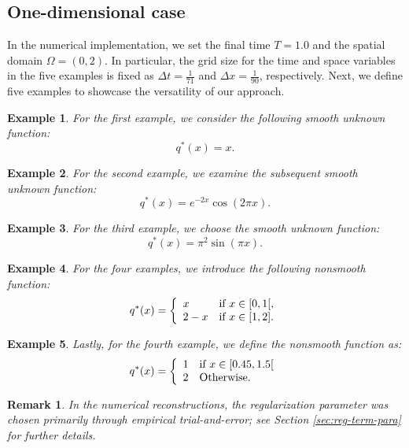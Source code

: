 \documentclass[a4paper,12pt,reqno,natbib]{amsart}
\newtheorem{exm}{Example}
\newtheorem{remark}[theorem]{Remark}
\begin{document}
{\subsection{One-dimensional case}

In the numerical implementation, we set the final time $T=1.0$ and the spatial domain $\Omega=(0,2)$. In particular, the grid size for the time and space variables in the five examples is fixed as $\Delta t=\displaystyle\frac{1}{71}$ and $\Delta x=\displaystyle\frac{1}{90}$, respectively. Next, we define five examples to showcase the versatility of our approach.

\begin{exm}\label{example0}
For the first example, we consider the following smooth unknown function:
\[ q^*(x)=x. \]
\end{exm}
\begin{exm}\label{example1}
For the second example, we examine the subsequent smooth unknown function:
\[ q^*(x)=e^{-2x}\cos(2\pi x). \]
\end{exm}

\begin{exm}\label{example2}
For the third example, we choose the smooth unknown function:
\[ q^*(x)=\pi^2\sin(\pi x). \]
\end{exm}

\begin{exm}\label{example3}
For the four examples, we introduce the following nonsmooth function:
\[ 
q^*(x)=\left\lbrace 
\begin{array}{ l l l l}
x & \text{if }  x\in [0,1[,\\
2-x & \text{if }  x\in [1,2] .
\end{array}
\right. 
\]
\end{exm}

\begin{exm}\label{example4}
Lastly, for the fourth example, we define the nonsmooth function as:
\[ 
q^*(x)=\left\lbrace 
\begin{array}{ l l l l}
1 & \text{if } x\in [0.45,1.5[\\
2 &  \text{Otherwise}.
\end{array}
\right. 
\]
\end{exm}

\begin{remark}
In the numerical reconstructions, the regularization parameter was chosen primarily through empirical trial-and-error; see Section \ref{sec:reg-term-para} for further details.
\end{remark}
}
\end{document}

